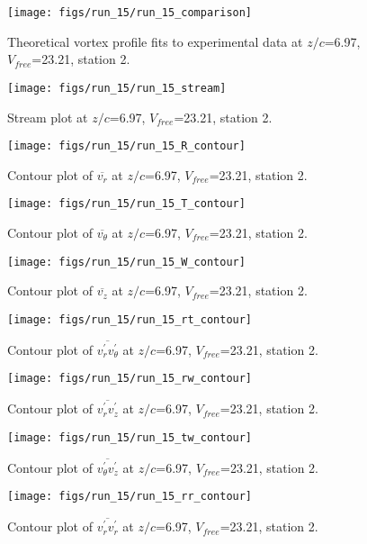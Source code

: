\begin{figure}[H]
\centering
\texttt{[image: figs/run\_15/run\_15\_comparison]}
\caption{Theoretical vortex profile fits to experimental data at $z/c$=6.97, $V_{free}$=23.21, station 2.}
\end{figure}


\begin{figure}[H]
\centering
\texttt{[image: figs/run\_15/run\_15\_stream]}
\caption{Stream plot at $z/c$=6.97, $V_{free}$=23.21, station 2.}
\end{figure}


\begin{figure}[H]
\centering
\texttt{[image: figs/run\_15/run\_15\_R\_contour]}
\caption{Contour plot of $\overline{v_{r}}$ at $z/c$=6.97, $V_{free}$=23.21, station 2.}
\end{figure}


\begin{figure}[H]
\centering
\texttt{[image: figs/run\_15/run\_15\_T\_contour]}
\caption{Contour plot of $\overline{v_{\theta}}$ at $z/c$=6.97, $V_{free}$=23.21, station 2.}
\end{figure}


\begin{figure}[H]
\centering
\texttt{[image: figs/run\_15/run\_15\_W\_contour]}
\caption{Contour plot of $\overline{v_{z}}$ at $z/c$=6.97, $V_{free}$=23.21, station 2.}
\end{figure}


\begin{figure}[H]
\centering
\texttt{[image: figs/run\_15/run\_15\_rt\_contour]}
\caption{Contour plot of $\overline{v_{r}^{\prime} v_{\theta}^{\prime}}$ at $z/c$=6.97, $V_{free}$=23.21, station 2.}
\end{figure}


\begin{figure}[H]
\centering
\texttt{[image: figs/run\_15/run\_15\_rw\_contour]}
\caption{Contour plot of $\overline{v_{r}^{\prime} v_{z}^{\prime}}$ at $z/c$=6.97, $V_{free}$=23.21, station 2.}
\end{figure}


\begin{figure}[H]
\centering
\texttt{[image: figs/run\_15/run\_15\_tw\_contour]}
\caption{Contour plot of $\overline{v_{\theta}^{\prime} v_{z}^{\prime}}$ at $z/c$=6.97, $V_{free}$=23.21, station 2.}
\end{figure}


\begin{figure}[H]
\centering
\texttt{[image: figs/run\_15/run\_15\_rr\_contour]}
\caption{Contour plot of $\overline{v_{r}^{\prime} v_{r}^{\prime}}$ at $z/c$=6.97, $V_{free}$=23.21, station 2.}
\end{figure}


